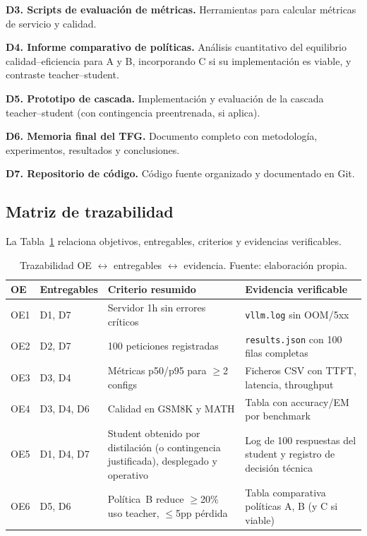 \documentclass[11pt,a4paper]{article}
\begin{document}
\textbf{D3. Scripts de evaluación de métricas.} Herramientas para calcular métricas de servicio y calidad.

\textbf{D4. Informe comparativo de políticas.} Análisis cuantitativo del equilibrio calidad--eficiencia para A y B, incorporando C si su implementación es viable, y contraste teacher--student.

\textbf{D5. Prototipo de cascada.} Implementación y evaluación de la cascada teacher--student (con contingencia preentrenada, si aplica).

\textbf{D6. Memoria final del TFG.} Documento completo con metodología, experimentos, resultados y conclusiones.

\textbf{D7. Repositorio de código.} Código fuente organizado y documentado en Git.

\subsection{Matriz de trazabilidad}

La Tabla~\ref{tab:trace} relaciona objetivos, entregables, criterios y evidencias verificables.

\begin{table}[H]
\centering
\caption{Trazabilidad OE $\leftrightarrow$ entregables $\leftrightarrow$ evidencia. Fuente: elaboración propia.}
\label{tab:trace}
\footnotesize
\setlength{\tabcolsep}{3pt}
\begin{tabularx}{\textwidth}{>{\raggedright\arraybackslash}p{0.8cm} >{\raggedright\arraybackslash}p{1.8cm} X >{\raggedright\arraybackslash}p{3.8cm}}
\toprule
\textbf{OE} & \textbf{Entregables} & \textbf{Criterio resumido} & \textbf{Evidencia verificable} \\
\midrule
OE1 & D1, D7 & Servidor 1h sin errores críticos & \texttt{vllm.log} sin OOM/5xx \\
OE2 & D2, D7 & 100 peticiones registradas & \texttt{results.json} con 100 filas completas \\
OE3 & D3, D4 & Métricas p50/p95 para $\geq$2 configs & Ficheros CSV con TTFT, latencia, throughput \\
OE4 & D3, D4, D6 & Calidad en GSM8K y MATH & Tabla con accuracy/EM por benchmark \\
OE5 & D1, D4, D7 & Student obtenido por distilación (o contingencia justificada), desplegado y operativo & Log de 100 respuestas del student y registro de decisión técnica \\
OE6 & D5, D6 & Política~B reduce $\geq$20\% uso teacher, $\leq$5pp pérdida & Tabla comparativa políticas A, B (y C si viable) \\
\bottomrule
\end{tabularx}
\end{table}
\end{document}
